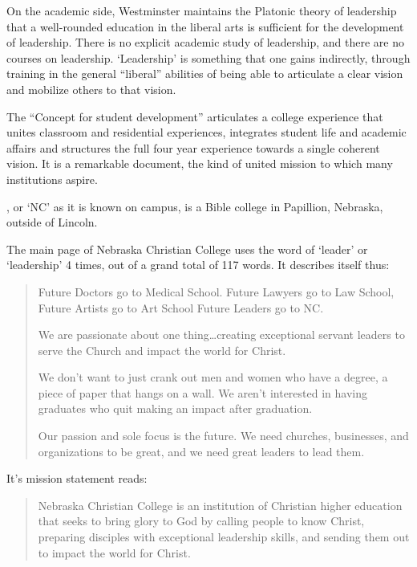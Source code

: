 On the academic side, Westminster maintains the Platonic theory of leadership that a well-rounded education in the liberal arts is sufficient for the development of leadership. There is no explicit academic study of leadership, and there are no courses on leadership. `Leadership' is something that one gains indirectly, through training in the general ``liberal'' abilities of being able to articulate a clear vision and mobilize others to that vision.

The ``Concept for student development'' articulates a college experience that unites classroom and residential experiences, integrates student life and academic affairs and structures the full four year experience towards a single coherent vision. It is a remarkable document, the kind of united mission to which many institutions aspire.

, or `NC' as it is known on campus, is a Bible college in Papillion, Nebraska, outside of Lincoln.

The main page of Nebraska Christian College uses the word of `leader' or `leadership' 4 times, out of a grand total of 117 words. It describes itself thus:

\begin{quote}

Future Doctors go to Medical School. Future Lawyers go to Law School, Future Artists go to Art School Future Leaders go to NC. 

We are passionate about one thing{\ldots}creating exceptional servant leaders to serve the Church and impact the world for Christ.

We don't want to just crank out men and women who have a degree, a piece of paper that hangs on a wall. We aren't interested in having graduates who quit making an impact after graduation. 

Our passion and sole focus is the future. We need churches, businesses, and organizations to be great, and we need great leaders to lead them.
\end{quote}

It's mission statement reads:

\begin{quote}

Nebraska Christian College is an institution of Christian higher education that seeks to bring glory to God by calling people to know Christ, preparing disciples with exceptional leadership skills, and sending them out to impact the world for Christ.
\end{quote}

